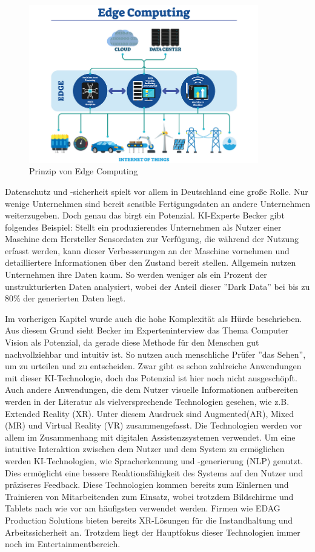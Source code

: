 \documentclass[a4paper,12pt, german]{report}
\begin{document}
\begin{figure}[H]
  \center
 \includegraphics[width=10cm]{images/edge.png}
  \caption[Prinzip von Edge Computing]{Prinzip von Edge Computing \cite{43}}
\end{figure}

Datenschutz und -sicherheit spielt vor allem in Deutschland eine große Rolle. Nur wenige Unternehmen sind bereit sensible Fertigungsdaten an andere Unternehmen weiterzugeben. Doch genau das birgt ein Potenzial. KI-Experte Becker gibt folgendes Beispiel: Stellt ein produzierendes Unternehmen als Nutzer einer Maschine dem Hersteller Sensordaten zur Verfügung, die während der Nutzung erfasst werden, kann dieser Verbesserungen an der Maschine vornehmen und detailliertere Informationen über den Zustand bereit stellen.\cite{41}\newline
Allgemein nutzen Unternehmen ihre Daten kaum. So werden weniger als ein Prozent der unstrukturierten Daten analysiert, wobei der Anteil dieser ''Dark Data'' bei bis zu 80\% der generierten Daten liegt.\cite{36}

Im vorherigen Kapitel wurde auch die hohe Komplexität als Hürde beschrieben. Aus diesem Grund sieht Becker im Experteninterview das Thema Computer Vision als Potenzial, da gerade diese Methode für den Menschen gut nachvollziehbar und intuitiv ist. So nutzen auch menschliche Prüfer ''das Sehen'', um zu urteilen und zu entscheiden. Zwar gibt es schon zahlreiche Anwendungen mit dieser KI-Technologie, doch das Potenzial ist hier noch nicht ausgeschöpft. \newline Auch andere Anwendungen, die dem Nutzer visuelle Informationen aufbereiten werden in der Literatur als vielversprechende Technologien gesehen, wie z.B. Extended Reality (XR). Unter diesem Ausdruck sind Augmented(AR), Mixed (MR) und Virtual Reality (VR) zusammengefasst. Die Technologien werden vor allem im Zusammenhang mit digitalen Assistenzsystemen verwendet. Um eine intuitive Interaktion zwischen dem Nutzer und dem System zu ermöglichen werden KI-Technologien, wie Spracherkennung und -generierung (NLP) genutzt. Dies ermöglicht eine bessere Reaktionsfähigkeit des Systems auf den Nutzer und präziseres Feedback. Diese Technologien kommen bereits zum Einlernen und Trainieren von Mitarbeitenden zum Einsatz, wobei trotzdem Bildschirme und Tablets nach wie vor am häufigsten verwendet werden.\cite{37} Firmen wie EDAG Production Solutions bieten bereits XR-Lösungen für die Instandhaltung und Arbeitssicherheit an.\cite{42} Trotzdem liegt der Hauptfokus dieser Technologien immer noch im Entertainmentbereich.
\end{document}
